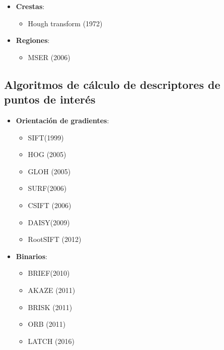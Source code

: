 \begin{itemize}
    \item \textbf{Crestas}:     %
    \begin{itemize}
        \item Hough transform (1972) \cite{duda1972use}
    \end{itemize}

    \item \textbf{Regiones}:    %
    \begin{itemize}
        \item MSER (2006) \cite{donoser2006efficient}
    \end{itemize}
\end{itemize}


\subsection{Algoritmos de cálculo de descriptores de puntos de interés}
\begin{itemize}
    \item \textbf{Orientación de gradientes}: 
    \begin{itemize}
        \item SIFT\footnotemark[2] (1999) \cite{sift}
        \item HOG (2005) \cite{dalal2005histograms}
        \item GLOH (2005) \cite{mikolajczyk2005performance}
        \item SURF\footnotemark[3] (2006) \cite{bay2006surf,BAY2008346}
        \item CSIFT (2006) \cite{abdel2006csift}
        \item DAISY\footnotemark[1] (2009) \cite{tola2009daisy}
        \item RootSIFT (2012) \cite{arandjelovic2012three}
    \end{itemize}
    
    \item \textbf{Binarios}: 
    \begin{itemize}
        \item BRIEF\footnotemark[1] (2010) \cite{calonder2010brief}
        \item AKAZE (2011) \cite{akaze-alcantarilla2011fast}
        \item BRISK (2011) \cite{leutenegger2011brisk}
        \item ORB (2011) \cite{rublee2011orb}
        \item LATCH (2016) \cite{Riggan20162016IW}
    \end{itemize}
\end{itemize}


